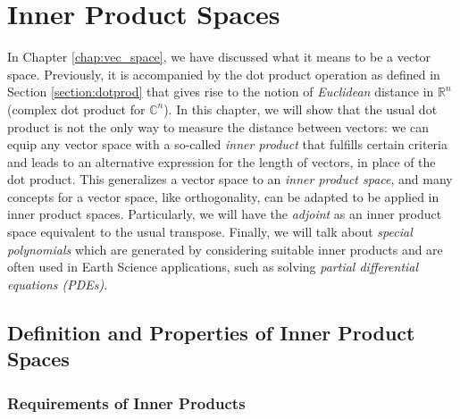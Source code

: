 \chapter{Inner Product Spaces}
\label{chap:innerchap}

In Chapter \ref{chap:vec_space}, we have discussed what it means to be a vector space. Previously, it is accompanied by the dot product operation as defined in Section \ref{section:dotprod} that gives rise to the notion of \textit{Euclidean} distance in $\mathbb{R}^n$ (complex dot product for $\mathbb{C}^n$). In this chapter, we will show that the usual dot product is not the only way to measure the distance between vectors: we can equip any vector space with a so-called \textit{inner product} that fulfills certain criteria and leads to an alternative expression for the length of vectors, in place of the dot product. This generalizes a vector space to an \textit{inner product space}, and many concepts for a vector space, like orthogonality, can be adapted to be applied in inner product spaces. Particularly, we will have the \textit{adjoint} as an inner product space equivalent to the usual transpose. Finally, we will talk about \textit{special polynomials} which are generated by considering suitable inner products and are often used in Earth Science applications, such as solving \textit{partial differential equations (PDEs)}.

\section{Definition and Properties of Inner Product Spaces}

\subsection{Requirements of Inner Products}

